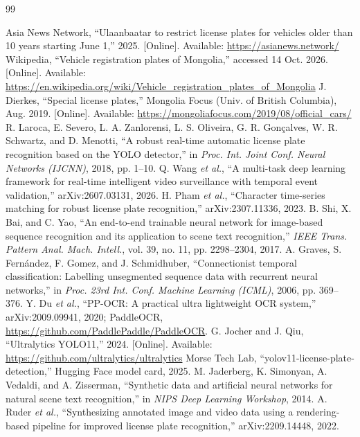 \begin{thebibliography}{99}
 Asia News Network, ``Ulaanbaatar to restrict license plates for vehicles older than 10 years starting June 1,'' 2025. [Online]. Available: \url{https://asianews.network/}
 Wikipedia, ``Vehicle registration plates of Mongolia,'' accessed 14 Oct. 2026. [Online]. Available: \url{https://en.wikipedia.org/wiki/Vehicle_registration_plates_of_Mongolia}
 J. Dierkes, ``Special license plates,'' Mongolia Focus (Univ. of British Columbia), Aug. 2019. [Online]. Available: \url{https://mongoliafocus.com/2019/08/official_cars/}
 R. Laroca, E. Severo, L. A. Zanlorensi, L. S. Oliveira, G. R. Gon\c{c}alves, W. R. Schwartz, and D. Menotti, ``A robust real-time automatic license plate recognition based on the YOLO detector,'' in \emph{Proc. Int. Joint Conf. Neural Networks (IJCNN)}, 2018, pp. 1--10.
 Q. Wang \emph{et al.}, ``A multi-task deep learning framework for real-time intelligent video surveillance with temporal event validation,'' arXiv:2607.03131, 2026.
 H. Pham \emph{et al.}, ``Character time-series matching for robust license plate recognition,'' arXiv:2307.11336, 2023.
 B. Shi, X. Bai, and C. Yao, ``An end-to-end trainable neural network for image-based sequence recognition and its application to scene text recognition,'' \emph{IEEE Trans. Pattern Anal. Mach. Intell.}, vol. 39, no. 11, pp. 2298--2304, 2017.
 A. Graves, S. Fern\'andez, F. Gomez, and J. Schmidhuber, ``Connectionist temporal classification: Labelling unsegmented sequence data with recurrent neural networks,'' in \emph{Proc. 23rd Int. Conf. Machine Learning (ICML)}, 2006, pp. 369--376.
 Y. Du \emph{et al.}, ``PP-OCR: A practical ultra lightweight OCR system,'' arXiv:2009.09941, 2020; PaddleOCR, \url{https://github.com/PaddlePaddle/PaddleOCR}.
 G. Jocher and J. Qiu, ``Ultralytics YOLO11,'' 2024. [Online]. Available: \url{https://github.com/ultralytics/ultralytics}
 Morse Tech Lab, ``yolov11-license-plate-detection,'' Hugging Face model card, 2025.
 M. Jaderberg, K. Simonyan, A. Vedaldi, and A. Zisserman, ``Synthetic data and artificial neural networks for natural scene text recognition,'' in \emph{NIPS Deep Learning Workshop}, 2014.
 A. Ruder \emph{et al.}, ``Synthesizing annotated image and video data using a rendering-based pipeline for improved license plate recognition,'' arXiv:2209.14448, 2022.

\end{thebibliography}
